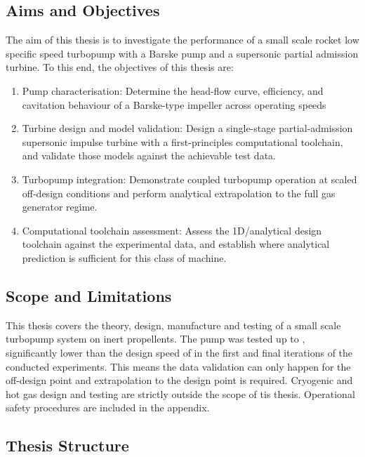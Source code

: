 \subsection{Aims and Objectives}
The aim of this thesis is to investigate the performance of a small scale rocket low specific speed turbopump with a Barske pump and a supersonic partial admission turbine. To this end, the objectives of this thesis are:

\begin{enumerate}
    \item Pump characterisation: Determine the head-flow curve, efficiency, and cavitation behaviour of a Barske-type impeller across operating speeds
    \item Turbine design and model validation: Design a single-stage partial-admission supersonic impulse turbine with a first-principles computational toolchain, and validate those models against the achievable test data.
    \item Turbopump integration: Demonstrate coupled turbopump operation at scaled off-design conditions and perform analytical extrapolation to the full \valPumpRpmDesign gas generator regime.
    \item Computational toolchain assessment: Assess the 1D/analytical design toolchain against the experimental data, and establish where analytical prediction is sufficient for this class of machine.
\end{enumerate}

\subsection{Scope and Limitations}

This thesis covers the theory, design, manufacture and testing of a small scale turbopump system on inert propellents. The pump was tested up to \valPumpRpmMaxreached, significantly lower than the design speed of \valPumpRpmDesign in the first and final iterations of the conducted experiments. This means the data validation can only happen for the off-design point and extrapolation to the design point is required. Cryogenic and hot gas design and testing are strictly outside the scope of tis thesis. Operational safety procedures are included in the appendix.

\subsection{Thesis Structure}

